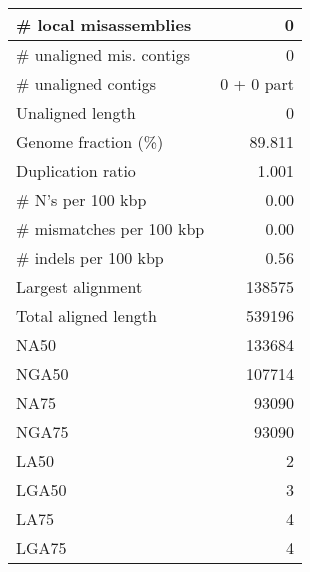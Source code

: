 \documentclass[12pt,a4paper]{article}
\begin{document}
\begin{table}[ht]
\begin{center}
\begin{tabular}{|l*{1}{|r}|}
\# local misassemblies & 0 \\ \hline
\# unaligned mis. contigs & 0 \\ \hline
\# unaligned contigs & 0 + 0 part \\ \hline
Unaligned length & 0 \\ \hline
Genome fraction (\%) & 89.811 \\ \hline
Duplication ratio & 1.001 \\ \hline
\# N's per 100 kbp & 0.00 \\ \hline
\# mismatches per 100 kbp & 0.00 \\ \hline
\# indels per 100 kbp & 0.56 \\ \hline
Largest alignment & 138575 \\ \hline
Total aligned length & 539196 \\ \hline
NA50 & 133684 \\ \hline
NGA50 & 107714 \\ \hline
NA75 & 93090 \\ \hline
NGA75 & 93090 \\ \hline
LA50 & 2 \\ \hline
LGA50 & 3 \\ \hline
LA75 & 4 \\ \hline
LGA75 & 4 \\ \hline
\end{tabular}
\end{center}
\end{table}
\end{document}
